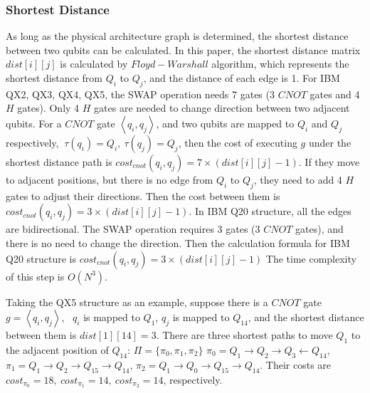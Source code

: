 \documentclass[runningheads]{llncs}
\begin{document}
\subsubsection{Shortest Distance}
As long as the physical architecture graph is determined, 
the shortest distance between two qubits can be calculated. 
In this paper, the shortest distance matrix $dist[i][j]$ is calculated by $Floyd-Warshall$ algorithm, 
which represents the shortest distance from $Q_{i}$ to $Q_{j}$, 
and the distance of each edge is 1. 
For IBM QX2, QX3, QX4, QX5, the SWAP operation needs 7 gates 
(3 $CNOT$ gates and 4 $H$ gates). 
Only 4 $H$ gates are needed to change direction between two adjacent qubits. 
For a $CNOT$ gate $\left \langle  q_{i},q_{j} \right \rangle $,
and two qubits are mapped to $Q_{i}$ and $Q_{j}$ respectively, $\ \tau(q_{i})=Q_{i},\ \tau(q_{j})=Q_{j}$, 
then the cost of executing $g$ under the shortest distance path is $cost_{cnot}(q_{i},q_{j})=7 \times( dist[i][j]-1)$.
If they move to adjacent positions, but there is no edge from $Q_{i}$ to $Q_{j}$,
they need to add 4 $H$ gates to adjust their directions.
 Then the cost between them is $cost_{cnot}(q_{i},q_{j})=3 \times( dist[i][j]-1)$.
In IBM Q20 structure, all the edges are bidirectional. 
The SWAP operation requires 3 gates (3 $CNOT$ gates), 
and there is no need to change the direction. 
Then the calculation formula for IBM Q20 structure is $cost_{cnot}(q_{i},q_{j})=3 \times( dist[i][j]-1)$
The time complexity of this step is $O (N^{3})$.
\begin{example}
	Taking the QX5 structure as an example, 
suppose there is a $CNOT$ gate $g=\left \langle  q_{i}, q_{j} \right \rangle $, \ $q_{i}$ is mapped to $Q_{1}$, 
 $q_{j}$ is mapped to $Q_{14}$, 
and the shortest distance between them  is $dist[1][14]=3$.
There are three shortest paths to move $Q_{1}$ to the adjacent position of $Q_{14}$:
$\Pi=\{\pi_{0},\pi_{1},\pi_{2}\}$
$\pi_{0}={Q_{1}\rightarrow Q_{2} \rightarrow Q_{3} \leftarrow Q_{14}}$,
$\pi_{1}={Q_{1}\rightarrow Q_{2} \rightarrow Q_{15} \rightarrow Q_{14}}$,
$\pi_{2}={Q_{1}\rightarrow Q_{0} \rightarrow Q_{15} \rightarrow Q_{14}}$.
Their costs are 
$cost_{\pi_{0}}=18,\ cost_{\pi_{1}}=14,\ cost_{\pi_{2}}=14$, respectively.
\end{example}
\end{document}
